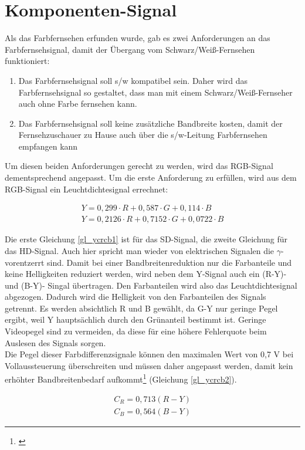 \section{Komponenten-Signal}
\label{sec_ycrcb}
Als das Farbfernsehen erfunden wurde, gab es zwei Anforderungen an das Farbfernsehsignal, damit der Übergang vom Schwarz/Weiß-Fernsehen funktioniert: 
\begin{enumerate}
\item Das Farbfernsehsignal soll s/w kompatibel sein. Daher wird das Farbfernsehsignal so gestaltet, dass man mit einem Schwarz/Weiß-Fernseher auch ohne Farbe fernsehen kann.
\item Das Farbfernsehsignal soll keine zusätzliche Bandbreite kosten, damit der Fernsehzuschauer zu Hause auch über die s/w-Leitung Farbfernsehen empfangen kann
\end{enumerate}

\noindent Um diesen beiden Anforderungen gerecht zu werden, wird das RGB-Signal dementsprechend angepasst. Um die erste Anforderung zu erfüllen, wird aus dem RGB-Signal ein Leuchtdichtesignal errechnet:

\begin{eqnarray}\label{gl_ycrcb1}
	Y = 0,299 \cdot R + 0,587 \cdot G + 0,114 \cdot B\\
	Y = 0,2126 \cdot R + 0,7152 \cdot G + 0,0722 \cdot B
\end{eqnarray}

\noindent Die erste Gleichung \ref{gl_ycrcb1} ist für das SD-Signal, die zweite Gleichung für das HD-Signal. Auch hier spricht man wieder von elektrischen Signalen die $\gamma$-vorentzerrt sind. Damit bei einer Bandbreitenreduktion nur die Farbanteile und keine Helligkeiten reduziert werden, wird neben dem Y-Signal auch ein (R-Y)- und (B-Y)- Singal übertragen. Den Farbanteilen wird also das Leuchtdichtesignal abgezogen. Dadurch wird die Helligkeit von den Farbanteilen des Signals getrennt. Es werden absichtlich R und B gewählt, da G-Y nur geringe Pegel ergibt, weil Y hauptsächlich durch den Grünanteil bestimmt ist. Geringe Videopegel sind zu vermeiden, da diese für eine höhere Fehlerquote beim Auslesen des Signals sorgen.\\ Die Pegel dieser Farbdifferenzsignale können den maximalen Wert von 0,7 V bei Vollaussteuerung überschreiten und müssen daher angepasst werden, damit kein erhöhter Bandbreitenbedarf aufkommt\footnote{\cite[84]{schmidt}} (Gleichung \ref{gl_ycrcb2}).

\begin{eqnarray}\label{gl_ycrcb2}
	C_{R}=0,713(R-Y)\\
	C_{B}=0,564(B-Y)
\end{eqnarray}

